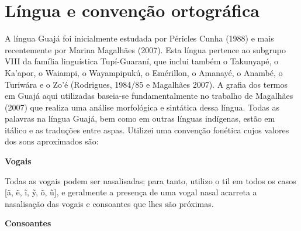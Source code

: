 
\chapter{Língua e convenção
ortográfica}\label{luxedngua-e-convenuxe7uxe3o-ortogruxe1fica}

\noindent A língua Guajá foi inicialmente estudada por Péricles Cunha (1988) e
mais recentemente por Marina Magalhães (2007). Esta língua pertence ao
subgrupo VIII da família linguística Tupí-Guaraní, que inclui também o
Takunyapé, o Ka'apor, o Waiampi, o Wayampipukú, o Emérillon, o Amanayé,
o Anambé, o Turiwára e o Zo'é (Rodrigues, 1984/85 e Magalhães 2007). A
grafia dos termos em Guajá aqui utilizadas baseia-se fundamentalmente no
trabalho de Magalhães (2007) que realiza uma análise morfológica e
sintática dessa língua. Todas as palavras na língua Guajá, bem como em
outras línguas indígenas, estão em itálico e as traduções entre aspas.
Utilizei uma convenção fonética cujos valores dos sons aproximados são:

\textbf{Vogais}


Todas as vogais podem ser nasalisadas; para tanto, utilizo o til em
todos os casos {[}ã, ẽ, ĩ, ỹ, õ, ũ{]}, e geralmente a presença de uma
vogal nasal acarreta a nasalisação das vogais e consoantes que lhes são
próximas.

\textbf{Consoantes}

